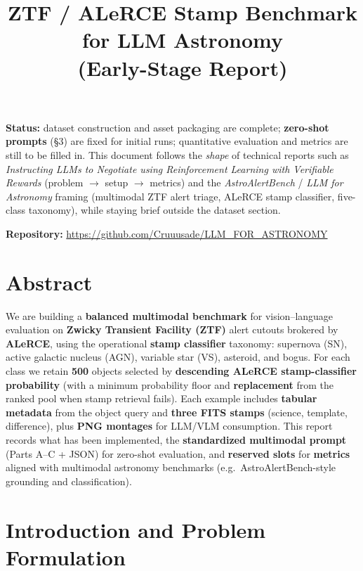 \documentclass[11pt,a4paper]{article}
\title{ZTF / ALeRCE Stamp Benchmark for LLM Astronomy\\(Early-Stage Report)}
\author{}
\date{}
\begin{document}
\maketitle

\noindent\textbf{Status:} dataset construction and asset packaging are complete; \textbf{zero-shot prompts} (\S3) are fixed for initial runs; quantitative evaluation and metrics are still to be filled in. This document follows the \textit{shape} of technical reports such as \textit{Instructing LLMs to Negotiate using Reinforcement Learning with Verifiable Rewards} (problem $\rightarrow$ setup $\rightarrow$ metrics) and the \textit{AstroAlertBench} / \textit{LLM for Astronomy} framing (multimodal ZTF alert triage, ALeRCE stamp classifier, five-class taxonomy), while staying brief outside the dataset section.

\medskip
\noindent\textbf{Repository:} \url{https://github.com/Cruuusade/LLM_FOR_ASTRONOMY}

\section*{Abstract}

We are building a \textbf{balanced multimodal benchmark} for vision--language evaluation on \textbf{Zwicky Transient Facility (ZTF)} alert cutouts brokered by \textbf{ALeRCE}, using the operational \textbf{stamp classifier} taxonomy: supernova (SN), active galactic nucleus (AGN), variable star (VS), asteroid, and bogus. For each class we retain \textbf{500} objects selected by \textbf{descending ALeRCE stamp-classifier probability} (with a minimum probability floor and \textbf{replacement} from the ranked pool when stamp retrieval fails). Each example includes \textbf{tabular metadata} from the object query and \textbf{three FITS stamps} (science, template, difference), plus \textbf{PNG montages} for LLM/VLM consumption. This report records what has been implemented, the \textbf{standardized multimodal prompt} (Parts A--C + JSON) for zero-shot evaluation, and \textbf{reserved slots} for \textbf{metrics} aligned with multimodal astronomy benchmarks (e.g.\ AstroAlertBench-style grounding and classification).

\section{Introduction and Problem Formulation}
\end{document}

